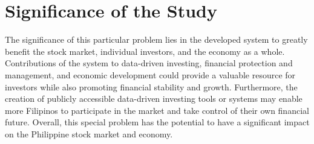 \section{Significance of the Study}
\label{sec:significance}
The significance of this particular problem lies in the developed 
system to greatly benefit the stock market, individual investors, and the economy as 
a whole. Contributions of the system to data-driven investing, financial protection 
and management, and economic development could provide a valuable resource for 
investors while also promoting financial stability and growth. Furthermore, 
the creation of publicly accessible data-driven investing tools or systems may enable 
more Filipinos to participate in the market and take control of their own 
financial future. Overall, this special problem has the potential to have a significant 
impact on the Philippine stock market and economy.
\hfill \\

